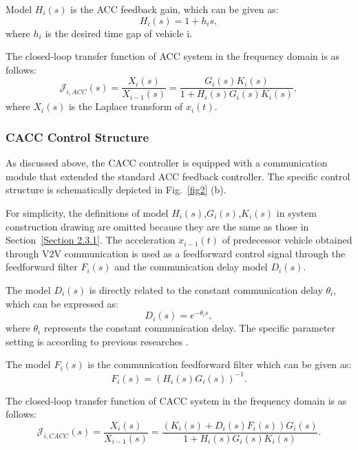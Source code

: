 \documentclass[a4paper,fleqn]{cas-sc}
\begin{document}
Model $H_i (s)$ is the ACC feedback gain, which can be given as:
\begin{equation}
  H_{i}(s)=1+h_{i} s,
\end{equation}
where $h_i$ is the desired time gap of vehicle i.

The closed-loop transfer function of ACC system in the frequency domain is as follows:
\begin{equation}
  \mathcal{J}_{i, A C C}(s)=\frac{X_{i}(s)}{X_{i-1}(s)}=\frac{G_{i}(s) K_{i}(s)}{1+H_{i}(s) G_{i}(s) K_{i}(s)},
\end{equation}
where $X_i (s)$ is the Laplace transform of $x_i (t)$.

\subsubsection{CACC Control Structure}
\label{Section 2.3.2}

As discussed above, the CACC controller is equipped with a communication module that extended the standard ACC feedback controller. The specific control structure is schematically depicted in Fig.~\ref{fig2} (b).

For simplicity, the definitions of model $H_i(s)$,$G_i(s)$,$K_i(s)$ in system construction drawing are omitted because they are the same as those in Section~\ref{Section 2.3.1}. The acceleration $\ddot{x}_{i-1}(t)$ of predecessor vehicle obtained through V2V communication is used as a feedforward control signal through the feedforward filter $F_i(s)$ and the communication delay model $D_i(s)$.

The model $D_i(s)$ is directly related to the constant communication delay $\theta_i$, which can be expressed as:
\begin{equation}
  D_{i}(s)=e^{-\theta_{i} s},
\end{equation}
where $\theta_i$ represents the constant communication delay. The specific parameter setting is according to previous researches \citep{navas2016using,zhang2020control}.

The model $F_i(s)$ is the communication feedforward filter which can be given as:
\begin{equation}
  F_{i}(s)=\left(H_{i}(s) G_{i}(s)\right)^{-1}.
\end{equation}

The closed-loop transfer function of CACC system in the frequency domain is as follows:
\begin{equation}
  \mathcal{J}_{i, C A C C}(s)=\frac{X_{i}(s)}{X_{i-1}(s)}=\frac{\left(K_{i}(s)+D_{i}(s) F_{i}(s)\right) G_{i}(s)}{1+H_{i}(s) G_{i}(s) K_{i}(s)}.
\end{equation}
\end{document}
